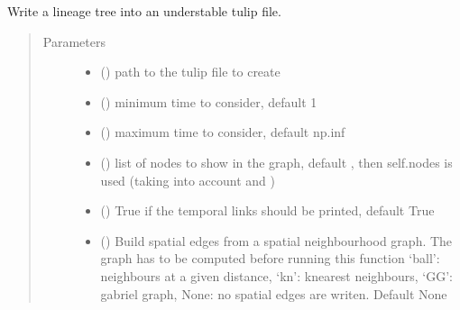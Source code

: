 \documentclass[letterpaper,10pt,english]{sphinxmanual}
\begin{document}
\begin{fulllineitems}

\begin{fulllineitems}
\label{\detokenize{index:LineageTree.lineageTree.to_tlp}}
Write a lineage tree into an understable tulip file.
\begin{quote}\begin{description}
\item[{Parameters}] \leavevmode\begin{itemize}
\item {} 
 () \textendash{} path to the tulip file to create

\item {} 
 () \textendash{} minimum time to consider, default \sphinxhyphen{}1

\item {} 
 () \textendash{} maximum time to consider, default np.inf

\item {} 
 (\sphinxstyleliteralemphasis{\sphinxupquote{{[}}}\sphinxstyleliteralemphasis{\sphinxupquote{, }}\sphinxstyleliteralemphasis{\sphinxupquote{{]}}}) \textendash{} list of nodes to show in the graph,
default , then self.nodes is used
(taking into account  and )

\item {} 
 () \textendash{} True if the temporal links should be printed, default True

\item {} 
 () \textendash{} Build spatial edges from a spatial neighbourhood graph.
The graph has to be computed before running this function
‘ball’: neighbours at a given distance,
‘kn’: k\sphinxhyphen{}nearest neighbours,
‘GG’: gabriel graph,
None: no spatial edges are writen.
Default None


\end{itemize}
\end{description}
\end{quote}
\end{fulllineitems}
\end{fulllineitems}
\end{document}

